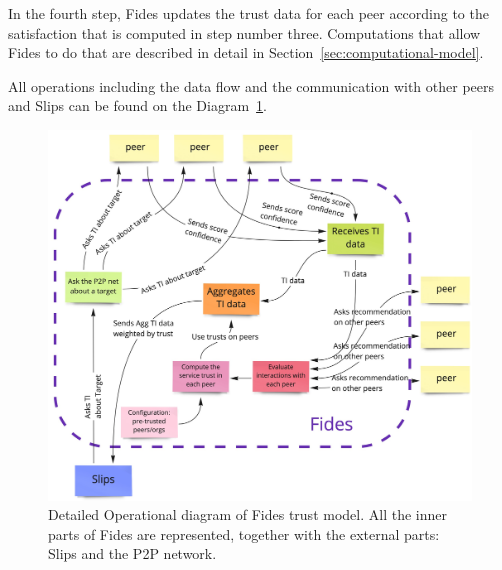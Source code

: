 In the fourth step, Fides updates the trust data for each peer according to the satisfaction that is computed in step number three.
Computations that allow Fides to do that are described in detail in Section~\ref{sec:computational-model}.

All operations including the data flow and the communication with other peers and Slips can be found on the Diagram~\ref{fig:trust-model-operational-diagram}.

\begin{figure}[h]
    \centering
    \includegraphics[width=1.0\textwidth]{assets/fides_operational_diagram.jpeg}
    \caption{Detailed Operational diagram of Fides trust model. All the inner parts of Fides are represented, together with the external parts: Slips and the P2P network.}
    \label{fig:trust-model-operational-diagram}
\end{figure}